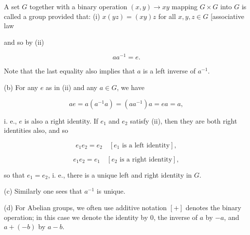 A set $G$ together with a binary operation $(x, y) \rightarrow xy$ mapping $G \times G$ into $G$ is called a group provided that:
(i) $x(yz) = (xy)z$ for all $x, y, z \in G$ [associative law

and so by (ii)

$$a a^{-1} = e.$$

Note that the last equality also implies that $a$ is a left inverse of $a^{-1}$.

(b) For any $e$ as in (ii) and any $a \in G$, we have

$$a e = a (a^{-1} a) = (a a^{-1}) a = e a = a,$$

i. e., $e$ is also a right identity. If $e_1$ and $e_2$ satisfy (ii), then they are both right identities also, and so

$$e_1 e_2 = e_2 \quad [e_1 \text{ is a left identity}] ,$$

$$e_1 e_2 = e_1 \quad [e_2 \text{ is a right identity}] ,$$

so that $e_1 = e_2$, i. e., there is a unique left and right identity in $G$.

(c) Similarly one sees that $a^{-1}$ is unique.

(d) For Abelian groups, we often use additive notation $[+]$ denotes the binary operation; in this case we denote the identity by 0, the inverse of $a$ by $-a$, and $a + (-b)$ by $a - b$.